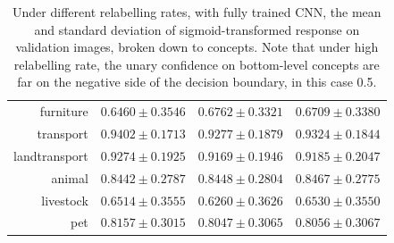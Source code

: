 \documentclass[11pt,a4paper]{article}
\begin{document}
\begin{table}[htbp]
\begin{tabular}{r|c|c|c}
furniture     & $0.6460\pm0.3546$ & $0.6762\pm0.3321$ & $0.6709\pm0.3380$\\
transport     & $0.9402\pm0.1713$ & $0.9277\pm0.1879$ & $0.9324\pm0.1844$\\
landtransport & $0.9274\pm0.1925$ & $0.9169\pm0.1946$ & $0.9185\pm0.2047$\\
animal        & $0.8442\pm0.2787$ & $0.8448\pm0.2804$ & $0.8467\pm0.2775$\\
livestock     & $0.6514\pm0.3555$ & $0.6260\pm0.3626$ & $0.6530\pm0.3550$\\
pet           & $0.8157\pm0.3015$ & $0.8047\pm0.3065$ & $0.8056\pm0.3067$
\end{tabular}
\caption{Under different relabelling rates, with fully trained CNN, the mean and standard deviation of sigmoid-transformed response on validation images, broken down to concepts. Note that under high relabelling rate, the unary confidence on bottom-level concepts are far on the negative side of the decision boundary, in this case 0.5.}
\label{tab:cnnresp}
\end{table}
\end{document}
